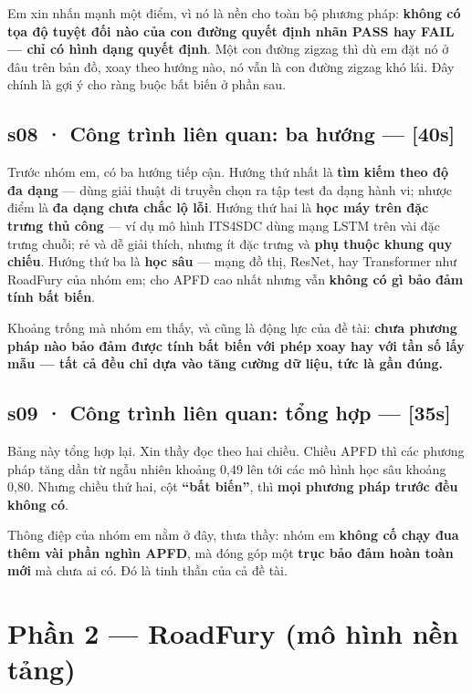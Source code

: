 \documentclass[
  11pt,
]{article}
\begin{document}
Em xin nhấn mạnh một điểm, vì nó là nền cho toàn bộ phương pháp:
\textbf{không có tọa độ tuyệt đối nào của con đường quyết định nhãn PASS
hay FAIL --- chỉ có hình dạng quyết định}. Một con đường zigzag thì dù
em đặt nó ở đâu trên bản đồ, xoay theo hướng nào, nó vẫn là con đường
zigzag khó lái. Đây chính là gợi ý cho ràng buộc bất biến ở phần sau.

\subsection{s08 · Công trình liên quan: ba hướng ---
{[}40s{]}}\label{s08-cuxf4ng-truxecnh-liuxean-quan-ba-hux1b0ux1edbng-40s}

Trước nhóm em, có ba hướng tiếp cận. Hướng thứ nhất là \textbf{tìm kiếm
theo độ đa dạng} --- dùng giải thuật di truyền chọn ra tập test đa dạng
hành vi; nhược điểm là \textbf{đa dạng chưa chắc lộ lỗi}. Hướng thứ hai
là \textbf{học máy trên đặc trưng thủ công} --- ví dụ mô hình ITS4SDC
dùng mạng LSTM trên vài đặc trưng chuỗi; rẻ và dễ giải thích, nhưng ít
đặc trưng và \textbf{phụ thuộc khung quy chiếu}. Hướng thứ ba là
\textbf{học sâu} --- mạng đồ thị, ResNet, hay Transformer như RoadFury
của nhóm em; cho APFD cao nhất nhưng vẫn \textbf{không có gì bảo đảm
tính bất biến}.

Khoảng trống mà nhóm em thấy, và cũng là động lực của đề tài:
\textbf{chưa phương pháp nào bảo đảm được tính bất biến với phép xoay
hay với tần số lấy mẫu --- tất cả đều chỉ dựa vào tăng cường dữ liệu,
tức là gần đúng.}

\subsection{s09 · Công trình liên quan: tổng hợp ---
{[}35s{]}}\label{s09-cuxf4ng-truxecnh-liuxean-quan-tux1ed5ng-hux1ee3p-35s}

Bảng này tổng hợp lại. Xin thầy đọc theo hai chiều. Chiều APFD thì các
phương pháp tăng dần từ ngẫu nhiên khoảng 0,49 lên tới các mô hình học
sâu khoảng 0,80. Nhưng chiều thứ hai, cột \textbf{``bất biến''}, thì
\textbf{mọi phương pháp trước đều không có}.

Thông điệp của nhóm em nằm ở đây, thưa thầy: nhóm em \textbf{không cố
chạy đua thêm vài phần nghìn APFD}, mà đóng góp một \textbf{trục bảo đảm
hoàn toàn mới} mà chưa ai có. Đó là tinh thần của cả đề tài.

\section{Phần 2 --- RoadFury (mô hình nền
tảng)}\label{phux1ea7n-2-roadfury-muxf4-huxecnh-nux1ec1n-tux1ea3ng}
\end{document}

